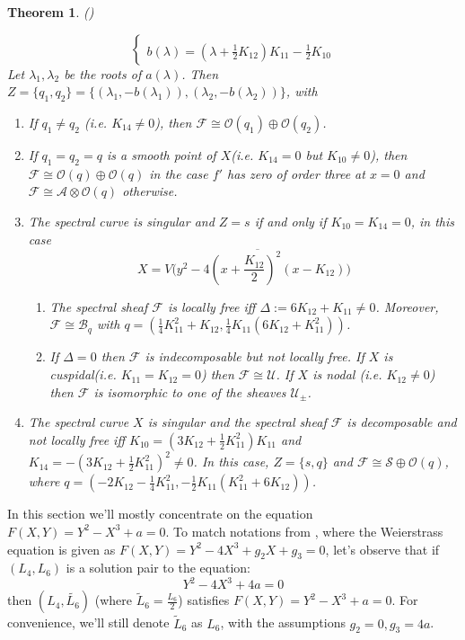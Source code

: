 \documentclass[11pt]{article}
\theoremstyle{definition}
\theoremstyle{plain}
\newtheorem{theorem}{Theorem}[section]
\numberwithin{equation}{section}
\begin{document}
\begin{theorem}{(\cite[Summary]{BZ})}
\begin{enumerate}
$$\begin{cases}
			\\b(\lambda)=(\lambda+\frac{1}{2}K_{12})K_{11}-\frac{1}{2}K_{10}
		\end{cases}
		$$
		Let $\lambda_1,\lambda_2$ be the roots of $a(\lambda)$. Then $Z=\{q_1,q_2\}=\{(\lambda_1,-b(\lambda_1)),(\lambda_2,-b(\lambda_2))\}$, with
		\begin{enumerate}
			\item[(1)] If $q_1\neq q_2$ (i.e. $K_{14}\neq 0$), then $\mathcal{F}\cong \mathcal{O}(q_1)\oplus\mathcal{O}(q_2)$. 
			\item[(2)] If $q_1= q_2=q$ is a smooth point of $X$(i.e. $K_{14}=0$ but $K_{10}\neq 0$), then $\mathcal{F}\cong \mathcal{O}(q)\oplus \mathcal{O}(q)$ in the case $f'$ has zero of order three at $x=0$ and $\mathcal{F}\cong \mathcal{A}\otimes \mathcal{O}(q)$ otherwise.
			\item[(3)] The spectral curve is singular and $Z={s}$ if and only if $K_{10}=K_{14}=0$, in this case 
			$$
			X=\overline{V\Big(y^2-4(x+\frac{K_{12}}{2})^2(x-K_{12})\Big)}
			$$
		    \begin{enumerate}
		    	\item[(a)] The spectral sheaf $\mathcal{F}$ is locally free iff $\Delta:=6K_{12}+K_{11}\neq 0$. Moreover, $\mathcal{F}\cong \mathcal{B}_q$ with $q=(\frac{1}{4}K_{11}^2+K_{12},\frac{1}{4}K_{11}(6K_{12}+K_{11}^2))$.
		    	\item[(b)] If $\Delta=0$ then $\mathcal{F}$ is indecomposable but not locally free. If $X$ is cuspidal(i.e. $K_{11}=K_{12}=0$) then $\mathcal{F}\cong \mathcal{U}$. If $X$ is nodal (i.e. $K_{12}\neq 0$) then $\mathcal{F}$ is isomorphic to one of the sheaves $\mathcal{U}_{\pm}$.
		    \end{enumerate}
		    \item[(4)] The spectral curve $X$ is singular and the spectral sheaf $\mathcal{F}$ is decomposable and not locally free iff $K_{10}=(3K_{12}+\frac{1}{2}K_{11}^2)K_{11}$ and $K_{14}=-(3K_{12}+\frac{1}{2}K_{11}^2)^2\neq 0$. In this case, $Z=\{s,q\}$ and $\mathcal{F}\cong \mathcal{S}\oplus \mathcal{O}(q)$, where $q=(-2K_{12}-\frac{1}{4}K_{11}^2,-\frac{1}{2}K_{11}(K_{11}^2+6K_{12}))$.
		\end{enumerate}
		\end{enumerate}
\end{theorem}







In this section we'll mostly concentrate on the equation $F(X,Y)=Y^2-X^3+a=0$. To match notations from \cite{BZ}, where the Weierstrass equation is given as $F(X,Y)=Y^2-4X^3+g_2X+g_3=0$, let's observe that if $(L_4,L_6)$ is a solution pair to the equation:
$$
Y^2-4X^3+4a=0
$$ 
then $(L_4,\tilde{L_6})$ (where $\tilde{L}_6=\frac{L_6}{2}$) satisfies $F(X,Y)=Y^2-X^3+a=0$. For convenience, we'll still denote $\tilde{L}_6$ as $L_6$, with the assumptions $g_2=0,g_3=4a$.
\end{document}
